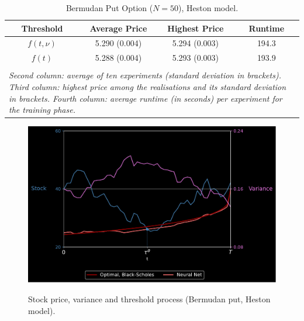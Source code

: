 \begin{table}[ht]
  \centering
  \caption{Bermudan Put Option ($N=50$), Heston model.}  
 
 \vspace{-2mm}
 
  \begin{tabular}{c c c c }
 \hline  \hline
  Threshold &  Average Price& Highest Price & Runtime  \\
  \hline  \hline
    $f(t,\nu)$ & 5.290 (0.004) & 5.294 (0.003) &  194.3 \\
  $f(t)$ & 5.288 (0.004) & 5.293 (0.003) &  193.9  \\
  \hline\\[-1em]
    
  \multicolumn{4}{l}{%
  \begin{minipage}{9.cm}%
    \tiny \textit{Second  column:  average  of ten experiments (standard deviation in brackets). Third column: highest price  among the realisations and its standard deviation in brackets.  Fourth column:  average runtime (in seconds) per experiment for the training phase.}%
  \end{minipage} }
\end{tabular}
\vspace{2mm}
\label{tab:resultPutHeston}
  \end{table}
 

\begin{figure}[H]
    \centering
     \caption{Stock price, variance and threshold process (Bermudan put, Heston model).}
    \includegraphics[scale = 0.4]{Figures/BdryHeston2.pdf}
    \label{fig:heston2}
\end{figure}


